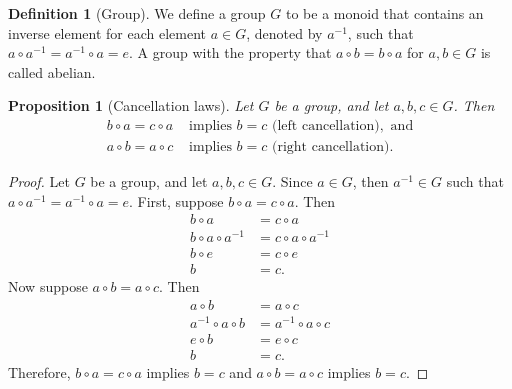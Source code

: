 \documentclass[12pt, titlepage]{amsart}
\newtheorem{prop}{Proposition}[subsection]
\theoremstyle{definition}
\newtheorem{definition}{Definition}[subsection]
\begin{document}
	\begin{definition}[Group]\label{definition:group}
		We define a group $G$ to be a monoid that contains an inverse element for each element $a \in G$, denoted by $a^{-1}$, such that $a \circ a^{-1} = a^{-1} \circ a = e$.
		A group with the property that $a \circ b = b \circ a$ for $a,b \in G$ is called abelian.
	\end{definition}

	\begin{prop}[Cancellation laws]\label{proposition:cancellation_laws}
		Let $G$ be a group, and let $a,b,c \in G$. Then
		\begin{align*}
		b \circ a=c \circ a &\text{ implies } b=c \text{ (left cancellation)}, \text{ and} \\
		a \circ b=a \circ c &\text{ implies } b=c \text{ (right cancellation)}.
		\end{align*}
	\end{prop}
	
	\begin{proof}
		Let $G$ be a group, and let $a,b,c \in G$.
		Since $a \in G$, then $a^{-1} \in G$ such that $a \circ a^{-1} = a^{-1} \circ a = e$.
		First, suppose $b \circ a=c \circ a$. Then 
		\begin{align*}
		b \circ a &= c \circ a \\
		b \circ a \circ a^{-1} &= c \circ a \circ a^{-1} \\
		b \circ e &= c \circ e \\
		b &= c.
		\end{align*}
		Now suppose $a \circ b=a \circ c$. Then
		\begin{align*}
		a \circ b &= a \circ c \\
		a^{-1} \circ a \circ b &= a^{-1} \circ a \circ c \\
		e \circ b &= e \circ c \\
		b &= c.
		\end{align*}
		Therefore, $b \circ a = c \circ a$ implies $b=c$ and $a \circ b = a \circ c$ implies $b=c$.			
	\end{proof}
		
\end{document}
